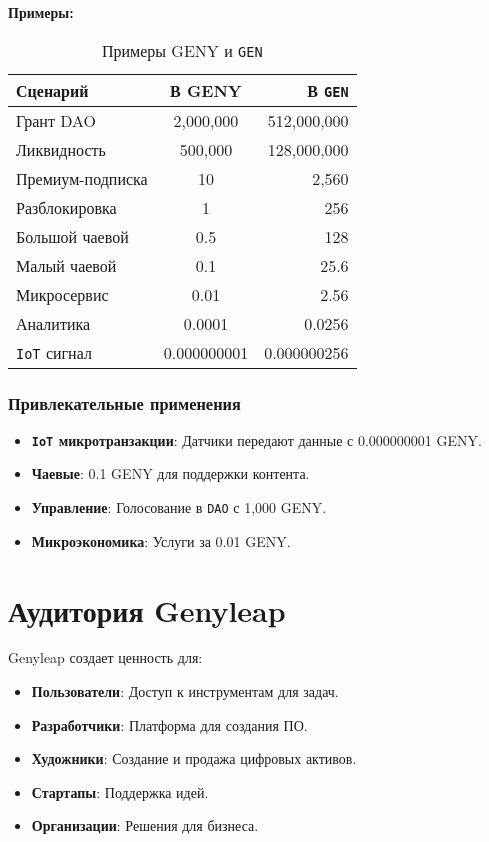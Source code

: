 \documentclass[a4paper,12pt,openany]{book}
\begin{document}
\textbf{Примеры:}
\begin{table}[h]
\centering
\caption{Примеры GENY и \texttt{GEN}}
\small
\begin{tabular}{l c r}
\hline
\textbf{Сценарий} & \textbf{В GENY} & \textbf{В \texttt{GEN}} \\
\hline
Грант DAO & 2,000,000 & 512,000,000 \\
Ликвидность & 500,000 & 128,000,000 \\
Премиум-подписка & 10 & 2,560 \\
Разблокировка & 1 & 256 \\
Большой чаевой & 0.5 & 128 \\
Малый чаевой & 0.1 & 25.6 \\
Микросервис & 0.01 & 2.56 \\
Аналитика & 0.0001 & 0.0256 \\
\texttt{IoT} сигнал & 0.000000001 & 0.000000256 \\
\hline
\end{tabular}
\end{table}

\subsection*{Привлекательные применения}
\begin{itemize}
    \item \textbf{\texttt{IoT} микротранзакции}: Датчики передают данные с 0.000000001 GENY.
    \item \textbf{Чаевые}: 0.1 GENY для поддержки контента.
    \item \textbf{Управление}: Голосование в \texttt{DAO} с 1,000 GENY.
    \item \textbf{Микроэкономика}: Услуги за 0.01 GENY.
\end{itemize}

\chapter{Аудитория Genyleap}
Genyleap создает ценность для:
\begin{itemize}
    \item \textbf{Пользователи}: Доступ к инструментам для задач.
    \item \textbf{Разработчики}: Платформа для создания ПО.
    \item \textbf{Художники}: Создание и продажа цифровых активов.
    \item \textbf{Стартапы}: Поддержка идей.
    \item \textbf{Организации}: Решения для бизнеса.
\end{itemize}
\end{document}
